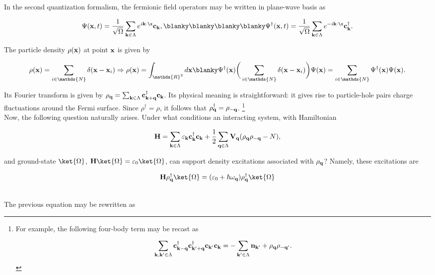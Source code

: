 In the second quantization formalism, the fermionic field operators may be written in plane-wave basis as 

$$
    \Psi({\bf x}, t) = \frac{1}{\sqrt{\Omega}} \sum_{{\bf k} \in \Lambda} e^{i {\bf k} \cdot {\x}} {\bf c}_{{\bf k}}, \blanky \blanky \blanky \blanky 
    \Psi^\dagger({\bf x}, t) = \frac{1}{\sqrt{\Omega}} \sum_{{\bf k} \in \Lambda} e^{-i {\bf k} \cdot {\x}} {\bf c}_{{\bf k}}^\dagger.
$$

The particle density $\rho({\bf x})$ at point ${\bf x}$ is given by 

$$
    \rho({\bf x}) = \sum_{i \in \mathds{N}} \delta({\bf x} - {\bf x}_i) \Rightarrow \rho({\bf x}) = \int_{\mathds{R}^3} d{\bf x} \blanky \Psi^\dagger({\bf x}) \bigg(\sum_{i \in \mathds{N}} \delta({\bf x} - {\bf x}_i)\bigg) \Psi({\bf x}) = \sum_{i \in \mathds{N} }\Psi^\dagger({\bf x}) \Psi({\bf x}). 
$$

Its Fourier transform is given by ${\rho_{{\bf q}}} = \sum_{{\bf k} \in \Lambda} {\bf c}_{{\bf k}+{\bf q}}^\dagger {\bf c}_{\bf k}$. Its physical meaning is straightforward: it gives rise to particle-hole pairs charge fluctuations around the Fermi surface. Since $\rho^\dagger = \rho$, it follows that $\rho_{{\bf q}}^\dagger = \rho_{-{\bf q}}$. \footnote{For example, the following four-body term may be recast as 

$$
\sum_{{\bf k, k'} \in \Lambda} {\bf c}_{{\bf k}-{\bf q}}^\dagger {\bf c}_{{\bf k}'+{\bf q}}^\dagger {\bf c}_{{\bf k}'} {\bf c}_{{\bf k}} = - \sum_{{\bf k'} \in \Lambda} {\bf n}_{{\bf k}'} + \rho_{{\bf q}} \rho_{-{\bf q}'}.
$$}\\

Now, the following question naturally arises. Under what conditions an interacting system, with Hamiltonian 

$$
    {\bf H} = \sum_{{\bf k} \in \Lambda} \varepsilon_{{\bf k}} {\bf c}_{{\bf k}}^\dagger {\bf c}_{{\bf k}} + \frac{1}{2} \sum_{{\bf q} \in \Lambda} {\bf V}_{{\bf q}} (\rho_{{\bf q}} \rho_{-{\bf q}} - N),
$$

and ground-state $\ket{\Omega}$, ${\bf H} \ket{\Omega} = \varepsilon_0 \ket{\Omega}$, can support density excitations associated with $\rho_{{\bf q}}$? Namely, these excitations are

$$
    {\bf H} \rho_{{\bf q}}^\dagger \ket{\Omega} = (\varepsilon_0 + \hbar \omega_{{\bf q}}) \rho_{{\bf q}}^\dagger \ket{\Omega}
$$

\blanky \\

The previous equation may be rewritten as 

